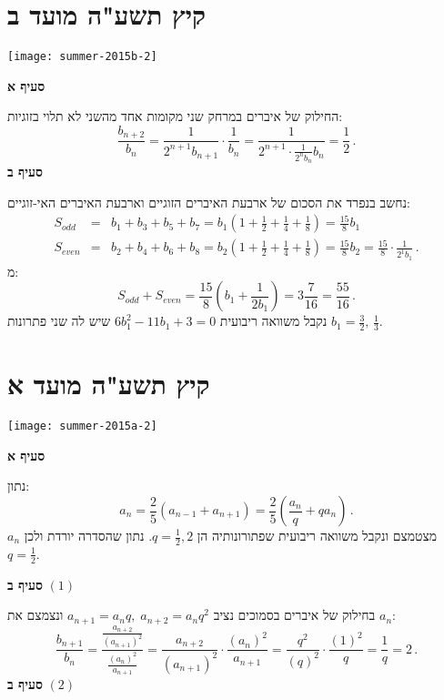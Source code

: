 \np
\section{קיץ תשע"ה מועד ב}

\begin{center}
\texttt{[image: summer-2015b-2]}
\end{center}
\vspace{-2ex}

\textbf{סעיף א}

החילוק של איברים במרחק שני מקומות אחד מהשני לא תלוי בזוגיות:
\[
\frac{b_{n+2}}{b_n} = \frac{1}{2^{n+1}b_{n+1}}\cdot\frac{1}{b_n}=\frac{1}{2^{n+1}\cdot\displaystyle\frac{1}{2^nb_n}{b_n}}= \frac{1}{2}\,.
\]
\textbf{סעיף ב}

נחשב בנפרד את הסכום של ארבעת האיברים הזוגיים וארבעת האיברים האי-זוגיים:
\begin{eqnarray*}
S_{\mathit{odd}} &=& b_1+b_3+b_5+b_7=b_1\left(1 + \frac{1}{2} + \frac{1}{4} +\frac{1}{8}\right)=\frac{15}{8}b_1\\
S_{\mathit{even}} &=& b_2+b_4+b_6+b_8=b_2\left(1 + \frac{1}{2} + \frac{1}{4} +\frac{1}{8}\right)=\frac{15}{8}b_2=\frac{15}{8}\cdot\frac{1}{2^1b_1}\,.
\end{eqnarray*}
מ:
\[
S_{\mathit{odd}} + S_{\mathit{even}} =\frac{15}{8}\left(b_1+\frac{1}{2b_1}\right)= 3\frac{7}{16}=\frac{55}{16}\,.
\]
נקבל משוואה ריבועית 
$6b_1^2-11b_1+3=0$
שיש לה שני פתרונות 
$b_1=\frac{3}{2},\,\frac{1}{3}$.

\np
\section{קיץ תשע"ה מועד א}

\begin{center}
\texttt{[image: summer-2015a-2]}
\end{center}
\vspace{-1ex}

\textbf{סעיף א}

נתון:
\[
a_n = \frac{2}{5}(a_{n-1}+a_{n+1}) =\frac{2}{5}\left(\frac{a_n}{q}+qa_n\right)\,.
\]
$a_n$
מצטמצם ונקבל משוואה ריבועית שפתורונותיה הן 
$q=\frac{1}{2},2$.
נתון שהסדרה יורדת ולכן
$q=\frac{1}{2}$.

\textbf{סעיף ב}
$(1)$

בחילוק של איברים בסמוכים נציב
$a_{n+1}=a_nq,\;a_{n+2}=a_nq^2$
ונצמצם את
$a_n$:
\[
\frac{b_{n+1}}{b_n} = \frac{\displaystyle\frac{a_{n+2}}{(a_{n+1})^2}}{\displaystyle\frac{(a_{n})^2}{a_{n+1}}}= \frac{a_{n+2}}{(a_{n+1})^2}\cdot\frac{(a_{n})^2}{a_{n+1}} = \frac{q^2}{(q)^2}\cdot\frac{(1)^2}{q}=\frac{1}{q}=2\,.
\]
\textbf{סעיף ב}
$(2)$

